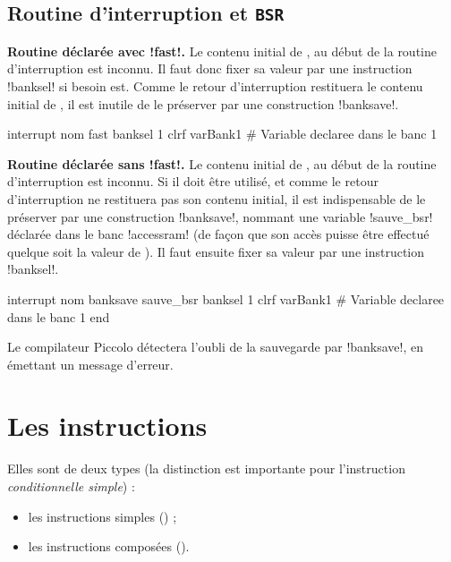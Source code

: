 \subsection{Routine d'interruption et \texttt{BSR}}

\textbf{Routine déclarée avec \pic!fast!.} Le contenu initial de , au début de la routine d’interruption est inconnu. Il faut donc fixer sa valeur par une instruction \pic!banksel! si besoin est. Comme le retour d’interruption restituera le contenu initial de , il est inutile de le préserver par une construction \pic!banksave!.

\begin{piccolo}
interrupt nom fast {
  banksel 1
  clrf varBank1 #  Variable declaree dans le banc 1
}
\end{piccolo}

\textbf{Routine déclarée sans \pic!fast!.} Le contenu initial de , au début de la routine d’interruption est inconnu. Si il doit être utilisé, et comme le retour d’interruption ne restituera pas son contenu initial, il est indispensable de le préserver par une construction \pic!banksave!, nommant une variable \pic!sauve_bsr! déclarée dans le banc \pic!accessram! (de façon que son accès puisse être effectué quelque soit la valeur de ). Il faut ensuite fixer sa valeur par une instruction \pic!banksel!. 

\begin{piccolo}
interrupt nom {
  banksave sauve_bsr
    banksel 1
    clrf varBank1 #  Variable declaree dans le banc 1
  end
}
\end{piccolo}

Le compilateur Piccolo détectera l’oubli de la sauvegarde par \pic!banksave!, en émettant un message d’erreur.


\section{Les instructions}

Elles sont de deux types (la distinction est importante pour l’instruction \emph{conditionnelle simple}) :
\begin{itemize}
  \item les instructions simples () ;
  \item les instructions composées ().

\end{itemize}


